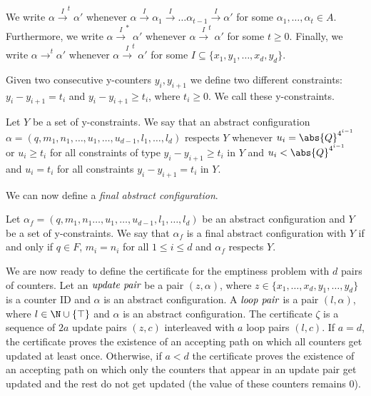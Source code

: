 We write $\alpha\xrightarrow{I}^t \alpha'$ whenever $\alpha\xrightarrow{I}\alpha_1\xrightarrow{I}\dots \alpha_{t-1}\xrightarrow{I}\alpha'$ for some $\alpha_1,\dots,\alpha_t\in A$. Furthermore, we write $\alpha\xrightarrow{I}^* \alpha'$ whenever $\alpha\xrightarrow{I}^t \alpha'$ for some $t\geq 0$. Finally, we write $\alpha\xrightarrow{}^t\alpha'$ whenever $\alpha\xrightarrow{I}^t\alpha'$ for some $I\subseteq\{x_1,y_1,\dots,x_d,y_d\}$.  

Given two consecutive y-counters $y_i,y_{i+1}$ we define two different constraints: $y_{i}-y_{i+1}=t_i$ and $y_{i}-y_{i+1}\geq t_i$, where $t_i\geq 0$. We call these y-constraints. 

\begin{definition}
Let $Y$ be a set of y-constraints. We say that an abstract configuration $\alpha=(q,m_1,n_1,\dots,u_1,\dots,u_{d-1},l_1,\dots,l_d)$ respects $Y$ whenever $u_i=\abs{Q}^{4^{i-1}}$ or $u_i\geq t_i$ for all constraints of type $y_{i}-y_{i+1} \geq t_i$ in $Y$ and $u_i<\abs{Q}^{4^{i-1}}$ and $u_i=t_i$ for all constraints $y_{i}-y_{i+1} = t_i$ in $Y$. 
\end{definition}


We can now define a \emph{final abstract configuration}. 

\begin{definition}
Let $\alpha_f = (q,m_1,n_1\dots,u_1,\dots,u_{d-1},l_1,\dots,l_d)$ be an abstract configuration and $Y$ be a set of y-constraints. We say that $\alpha_f$ is a final abstract configuration with $Y$ if and only if $q\in F$, $m_i=n_i$ for all $1\leq i\leq d$ and $\alpha_f$ respects $Y$.
\end{definition}



We are now ready to define the certificate for the emptiness problem with $d$ pairs of counters. Let an $\emph{update pair}$ be a pair $(z,\alpha)$, where $z\in\{x_1,\dots,x_d,y_1,\dots,y_d\}$ is a counter ID and $\alpha$ is an abstract configuration. A $\emph{loop pair}$ is a pair $(l,\alpha)$, where $l\in\N\cup\{\top\}$ and $\alpha$ is an abstract configuration. The certificate $\zeta$ is a sequence of $2a$ update pairs $(z,c)$ interleaved with $a$ loop pairs $(l,c)$. If $a=d$, the certificate proves the existence of an accepting path on which all counters get updated at least once. Otherwise, if $a<d$ the certificate proves the existence of an accepting path on which only the counters that appear in an update pair get updated and the rest do not get updated (the value of these counters remains $0$).

